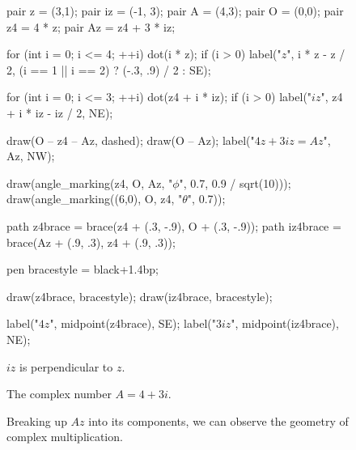 \documentclass[../gatm.tex]{subfiles}
\begin{document}
\begin{figure}[h]
\begin{center}
\begin{minipage}[b]{0.4\textwidth}
\begin{asy}[width=0.7\textwidth]
				pair z = (3,1);
				pair iz = (-1, 3);
				pair A = (4,3);
				pair O = (0,0);
				pair z4 = 4 * z;
				pair Az = z4 + 3 * iz;
				
				for (int i = 0; i <= 4; ++i) {
				dot(i * z);
				if (i > 0) label("$z$", i * z - z / 2, (i == 1 || i == 2) ? (-.3, .9) / 2 : SE);
				}
				
				for (int i = 0; i <= 3; ++i) {
				dot(z4 + i * iz);
				if (i > 0) label("$iz$", z4 + i * iz - iz / 2, NE);
				}
				
				draw(O -- z4 -- Az, dashed);
				draw(O -- Az);
				label("$4z + 3iz = Az$", Az, NW);
				
				draw(angle_marking(z4, O, Az, "$\phi$", 0.7, 0.9 / sqrt(10)));
				draw(angle_marking((6,0), O, z4, "$\theta$", 0.7));
				
				path z4brace = brace(z4 + (.3, -.9), O + (.3, -.9));
				path iz4brace = brace(Az + (.9, .3), z4 + (.9, .3));
				
				pen bracestyle = black+1.4bp;
				
				draw(z4brace, bracestyle);
				draw(iz4brace, bracestyle);
				
				label("$4z$", midpoint(z4brace), SE);
				label("$3iz$", midpoint(iz4brace), NE);
			\end{asy}
		\end{minipage}
	\end{center}
	\vspace*{-2\baselineskip}
	\begin{center}
		\begin{minipage}[t]{0.25\textwidth}
			\caption{$iz$ is perpendicular to $z$.}
			\label{fig:izzperp}
		\end{minipage}
		\hfill
		\begin{minipage}[t]{0.25\textwidth}
			\caption{The complex number $A=4+3i$.}
			\label{fig:lol}
		\end{minipage}
		\hfill
		\begin{minipage}[t]{0.4\textwidth}
			\caption{Breaking up $Az$ into its components, we can observe the geometry of complex multiplication.}
		\end{minipage}
	\end{center}
	\vspace*{-2\baselineskip}
\end{figure}

\newcommand{\Arg} {\operatorname{Arg}}
\newcommand{\cis} {\operatorname{cis}}
\newcommand{\Real} {\operatorname{Re}}
\newcommand{\Imag} {\operatorname{Im}}
\end{document}
